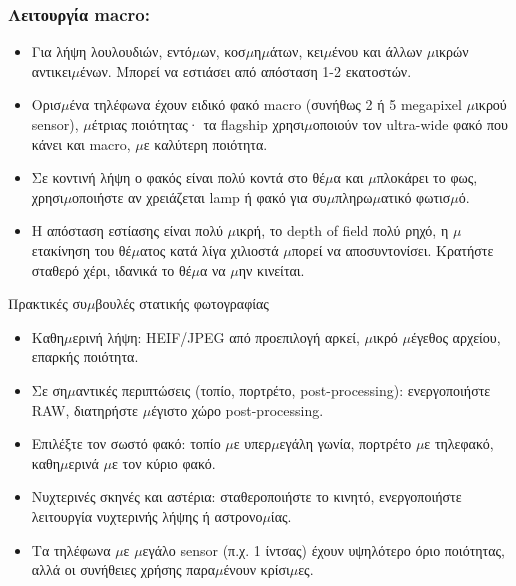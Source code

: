 \subsubsection*{Λειτουργία macro:}

\begin{itemize}
  \item Για λήψη λουλουδιών, εντό$\mu$ων, κοσ$\mu$η$\mu$άτων, κει$\mu$ένου και άλλων $\mu$ικρών αντικει$\mu$ένων. Μπορεί να εστιάσει από απόσταση 1-2 εκατοστών.
  \item Ορισ$\mu$ένα τηλέφωνα έχουν ειδικό φακό macro (συνήθως 2 ή 5 megapixel $\mu$ικρού sensor), $\mu$έτριας ποιότητας· τα flagship χρησι$\mu$οποιούν τον ultra-wide φακό που κάνει και macro, $\mu$ε καλύτερη ποιότητα.
  \item Σε κοντινή λήψη ο φακός είναι πολύ κοντά στο θέ$\mu$α και $\mu$πλοκάρει το φως, χρησι$\mu$οποιήστε αν χρειάζεται lamp ή φακό για συ$\mu$πληρω$\mu$ατικό φωτισ$\mu$ό.
  \item Η απόσταση εστίασης είναι πολύ $\mu$ικρή, το depth of field πολύ ρηχό, η $\mu$ετακίνηση του θέ$\mu$ατος κατά λίγα χιλιοστά $\mu$πορεί να αποσυντονίσει. Κρατήστε σταθερό χέρι, ιδανικά το θέ$\mu$α να $\mu$ην κινείται.
\end{itemize}

\begin{tcbinfo}{Πρακτικές συ$\mu$βουλές στατικής φωτογραφίας}
\begin{itemize}
  \item Καθη$\mu$ερινή λήψη: HEIF/JPEG από προεπιλογή αρκεί, $\mu$ικρό $\mu$έγεθος αρχείου, επαρκής ποιότητα.
  \item Σε ση$\mu$αντικές περιπτώσεις (τοπίο, πορτρέτο, post-processing): ενεργοποιήστε RAW, διατηρήστε $\mu$έγιστο χώρο post-processing.
  \item Επιλέξτε τον σωστό φακό: τοπίο $\mu$ε υπερ$\mu$εγάλη γωνία, πορτρέτο $\mu$ε τηλεφακό, καθη$\mu$ερινά $\mu$ε τον κύριο φακό.
  \item Νυχτερινές σκηνές και αστέρια: σταθεροποιήστε το κινητό, ενεργοποιήστε λειτουργία νυχτερινής λήψης ή αστρονο$\mu$ίας.
  \item Τα τηλέφωνα $\mu$ε $\mu$εγάλο sensor (π.χ. 1 ίντσας) έχουν υψηλότερο όριο ποιότητας, αλλά οι συνήθειες χρήσης παρα$\mu$ένουν κρίσι$\mu$ες.
\end{itemize}

\end{tcbinfo}

